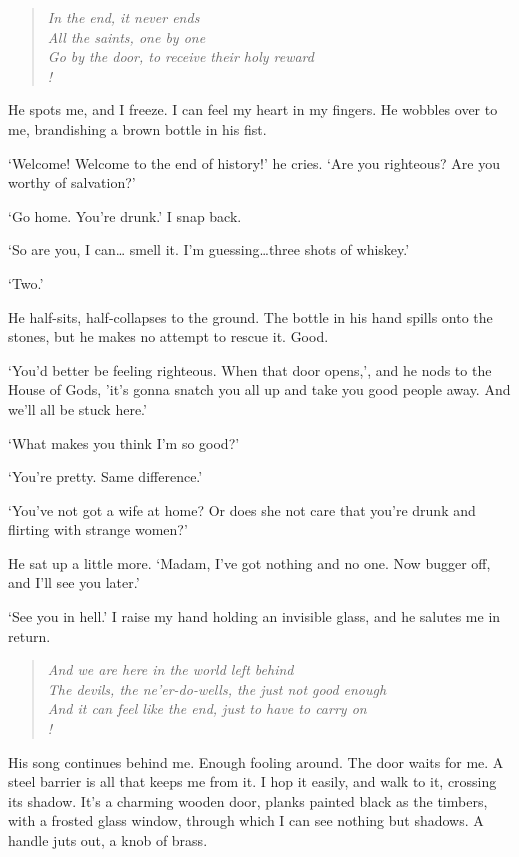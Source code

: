 \begin{verse}\it
In the end, it never ends\\
All the saints, one by one\\
Go by the door, to receive their holy reward\\!
\end{verse}

He spots me, and I freeze. I can feel my heart in my fingers. He
wobbles over to me, brandishing a brown bottle in his fist.

`Welcome! Welcome to the end of history!' he cries. `Are you
righteous? Are you worthy of salvation?'

`Go home. You’re drunk.' I snap back.

`So are you, I can… smell it. I’m guessing…three shots of whiskey.'

`Two.'

He half-sits, half-collapses to the ground. The bottle in his hand
spills onto the stones, but he makes no attempt to rescue it. Good.

`You’d better be feeling righteous. When that door opens,', and he
nods to the House of Gods, 'it’s gonna snatch you all up and take you
good people away. And we’ll all be stuck here.'

`What makes you think I’m so good?'

`You’re pretty. Same difference.'

`You’ve not got a wife at home? Or does she not care that you’re drunk
and flirting with strange women?'

He sat up a little more. `Madam, I’ve got nothing and no one. Now
bugger off, and I’ll see you later.'

`See you in hell.' I raise my hand holding an invisible glass, and he
salutes me in return.
\begin{verse}\it
	And we are here in the world left behind\\
	The devils, the ne’er-do-wells, the just not good enough\\
	And it can feel like the end, just to have to carry on\\!
\end{verse}

His song continues behind me. Enough fooling around. The door waits
for me. A steel barrier is all that keeps me from it. I hop it easily,
and walk to it, crossing its shadow. It’s a charming wooden door,
planks painted black as the timbers, with a frosted glass window,
through which I can see nothing but shadows. A handle juts out, a knob
of brass.

